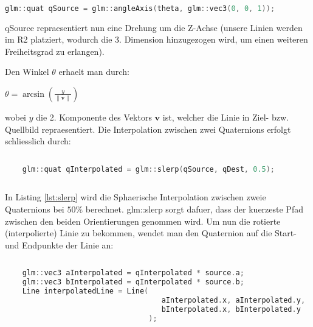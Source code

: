 \begin{lstlisting}[language=C++, caption=Quaternions in GLM, label=quaternion, xleftmargin=0.5cm]

glm::quat qSource = glm::angleAxis(theta, glm::vec3(0, 0, 1));
\end{lstlisting}
qSource repraesentiert nun eine Drehung um die Z-Achse
(unsere Linien werden im R2 platziert, wodurch die
3. Dimension hinzugezogen wird, um einen weiteren
Freiheitsgrad zu erlangen).

Den Winkel $\theta$ erhaelt man durch:

$\theta = \arcsin \left(\frac{y}{\|\textbf{v}\|}\right)$

wobei $y$ die 2. Komponente des Vektors $\textbf{v}$ ist, welcher die Linie in Ziel- bzw. Quellbild repraesentiert.
Die Interpolation zwischen zwei Quaternions erfolgt schliesslich durch:
\begin{lstlisting}[language=C++, caption=Spherical interpolation zwischen zwei Quaternions, label={lst:slerp}, xleftmargin=0.5cm]
	
	glm::quat qInterpolated = glm::slerp(qSource, qDest, 0.5);
	
\end{lstlisting}
In Listing \ref{lst:slerp} wird die Sphaerische Interpolation zwischen
zweie Quaternions bei $50\%$ berechnet.
glm::slerp sorgt dafuer, dass der kuerzeste Pfad zwischen
den beiden Orientierungen genommen wird. Um nun die rotierte (interpolierte)
Linie zu bekommen, wendet man den Quaternion auf die Start- und Endpunkte der
Linie an:
\begin{lstlisting}[language=C++, caption=Rotation der Quelllinie durch einen Quaternion, label={lst:quattimespoint}, xleftmargin=0.5cm]
	
	glm::vec3 aInterpolated = qInterpolated * source.a;
	glm::vec3 bInterpolated = qInterpolated * source.b;
	Line interpolatedLine = Line(
									aInterpolated.x, aInterpolated.y, 
									bInterpolated.x, bInterpolated.y
								 );	
\end{lstlisting}




